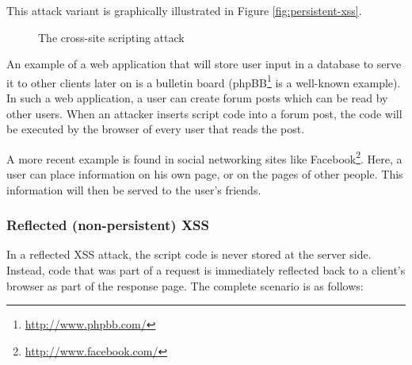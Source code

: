 This attack variant is graphically illustrated in Figure \ref{fig:persistent-xss}.

\begin{figure}[htb]
	\centering
	\caption{The cross-site scripting attack}
\end{figure}

An example of a web application that will store user input in a database to serve it to other clients later on is a bulletin board (phpBB\footnote{\url{http://www.phpbb.com/}} is a well-known example). In such a web application, a user can create forum posts which can be read by other users. When an attacker inserts script code into a forum post, the code will be executed by the browser of every user that reads the post.

A more recent example is found in social networking sites like Facebook\footnote{\url{http://www.facebook.com/}}. Here, a user can place information on his own page, or on the pages of other people. This information will then be served to the user's friends.

\subsubsection{Reflected (non-persistent) XSS}
In a reflected XSS attack, the script code is never stored at the server side. Instead, code that was part of a request is immediately reflected back to a client's browser as part of the response page. The complete scenario is as follows:

